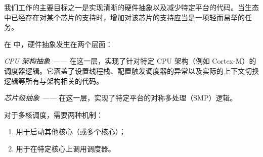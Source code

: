 我们工作的主要目标之一是实现清晰的硬件抽象以及减少特定平台的代码。当生态中已经存在对某个芯片的支持时，增加对该芯片的支持应当是一项轻而易举的任务。

    

在 \OSname{} 中，硬件抽象发生在两个层面：

\textit{CPU 架构抽象 ——} 在这一层，实现了针对特定 CPU 架构（例如 Cortex-M）的调度器逻辑。它涵盖了设置线程栈、配置触发调度器的异常以及实际的上下文切换逻辑等所有与架构相关的代码。

\textit{芯片级抽象 ——} 在这一层，实现了特定平台的对称多处理（SMP）逻辑。

对于多核调度，需要两种机制：
\begin{enumerate}[label=(\roman*)]
    \item 用于启动其他核心（或多个核心）；
    \item 用于在特定核心上调用调度器。
\end{enumerate}

